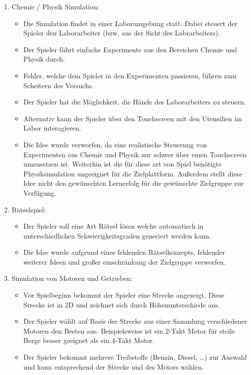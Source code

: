 	\begin{enumerate}
		\item{Chemie / Physik Simulation:}
		\begin{itemize}
			\item{Die Simulation findet in einer Laborumgebung statt. Dabei steuert der Spieler den Laborarbeiter (bzw. aus der Sicht des Labrarbeiters).}
			\item{Der Spieler führt einfache Experimente aus den Bereichen Chemie und Physik durch.}
			\item{Fehler, welche dem Spieler in den Experimenten passieren, führen zum Scheitern des Versuchs.}
			\item{Der Spieler hat die Möglichkeit, die Hände des Laborarbeiters zu steuern.}
			\item{Alternativ kann der Spieler über den Touchscreen mit den Utensilien im Labor interagieren.}
			\item{Die Idee wurde verworfen, da eine realistische Steuerung von Experimenten aus Chemie und Physik nur schwer über einen Touchscreen umzusetzen ist. Weiterhin ist die für diese art von Spiel benötigte Physiksimulation ungeeignet für die Zielplattform. Außerdem stellt diese Idee nicht den gewünschten Lernerfolg für die gewünschte Zielgruppe zur Verfügung. }
		\end{itemize}
		\item{Rätselspiel:}
		\begin{itemize}
			\item{Der Spieler soll eine Art Rätsel lösen welche automatisch in unterschiedlichen Schwierigkeitsgraden generiert werden kann.}
			\item{Die Idee wurde aufgrund eines fehlenden Rätselkonzepts, fehlender weiterer Ideen und großer einschränkung der Zielgruppe verworfen.}
		\end{itemize}
		\item{Simulation von Motoren und Getrieben:}
		\begin{itemize}
			\item{Vor Spielbeginn bekommt der Spieler eine Strecke angezeigt. Diese Strecke ist in 2D und zeichnet sich durch Höhenunterschiede aus.}
			\item{Der Spieler wählt auf Basis der Strecke aus einer Sammlung verschiedener Motoren den Besten aus. Beispielsweise ist ein 2-Takt Motor für steile Berge besser geeignet als ein 4-Takt Motor.}
			\item{Der Spieler bekommt mehrere Treibstoffe (Benzin, Diesel, \dots) zur Auswahl und kann entsprechend der Strecke und des Motors wählen.}

\end{itemize}
\end{enumerate}

